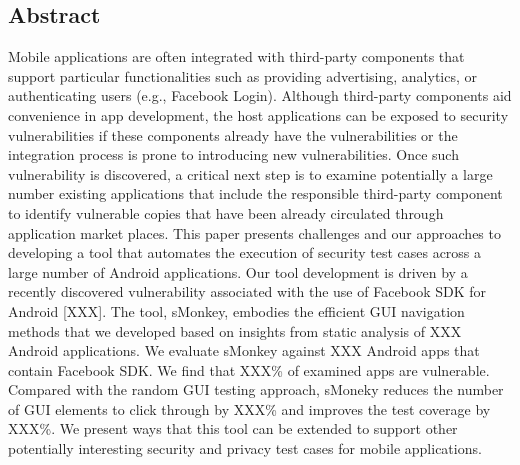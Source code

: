\subsection*{Abstract}
Mobile applications are often integrated with third-party components that support particular functionalities such as providing advertising, analytics, or authenticating users (e.g., Facebook Login). Although third-party components aid convenience in app development, the host applications can be exposed to security vulnerabilities if these components already have the vulnerabilities or the integration process is prone to introducing new vulnerabilities. Once such vulnerability is discovered, a critical next step is to examine potentially a large number existing applications that include the responsible third-party component to identify vulnerable copies that have been already circulated through application market places. This paper presents challenges and our approaches to developing a tool that automates the execution of security test cases across a large number of Android applications. Our tool development is driven by a recently discovered vulnerability associated with the use of Facebook SDK for Android [XXX]. The tool, sMonkey, embodies the efficient GUI navigation methods that we developed based on insights from static analysis of XXX Android applications. We evaluate sMonkey against XXX Android apps that contain Facebook SDK. We find that XXX\% of examined apps are vulnerable. Compared with the random GUI testing approach, sMoneky reduces the number of GUI elements to click through by XXX\% and improves the test coverage by XXX\%. We present ways that this tool can be extended to support other potentially interesting security and privacy test cases for mobile applications.~\cite{monkey}
